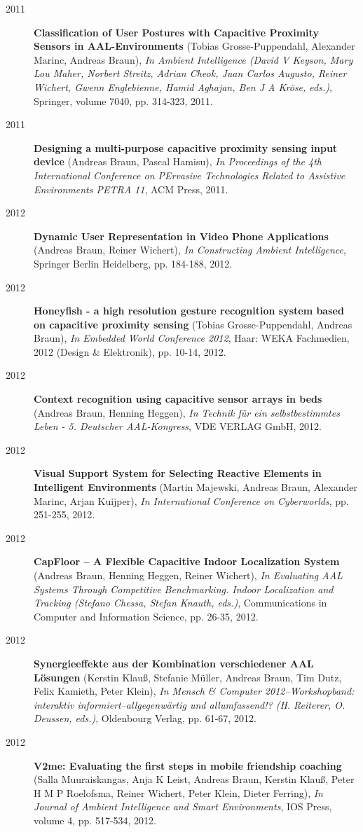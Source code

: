 \begin{appendix}
\begin{description}
\item[2011]{\bf Classification of User Postures with Capacitive Proximity Sensors in AAL-Environments} (Tobias Grosse-Puppendahl, Alexander Marinc, Andreas Braun), {\em In Ambient Intelligence (David V Keyson, Mary Lou Maher, Norbert Streitz, Adrian Cheok, Juan Carlos Augusto, Reiner Wichert, Gwenn Englebienne, Hamid Aghajan, Ben J A Kröse, eds.)}, Springer, volume 7040, pp. 314-323, 2011.
\item[2011]{\bf Designing a multi-purpose capacitive proximity sensing input device} (Andreas Braun, Pascal Hamisu), {\em In Proceedings of the 4th International Conference on PErvasive Technologies Related to Assistive Environments PETRA 11}, ACM Press, 2011.
\item[2012]{\bf Dynamic User Representation in Video Phone Applications} (Andreas Braun, Reiner Wichert), {\em In Constructing Ambient Intelligence}, Springer Berlin Heidelberg, pp. 184-188, 2012.
\item[2012]{\bf Honeyfish - a high resolution gesture recognition system based on capacitive proximity sensing} (Tobias Grosse-Puppendahl, Andreas Braun), {\em In Embedded World Conference 2012}, Haar: WEKA Fachmedien, 2012 (Design \& Elektronik), pp. 10-14, 2012.
\item[2012]{\bf Context recognition using capacitive sensor arrays in beds} (Andreas Braun, Henning Heggen), {\em In Technik für ein selbstbestimmtes Leben - 5. Deutscher AAL-Kongress}, VDE VERLAG GmbH, 2012.
\item[2012]{\bf Visual Support System for Selecting Reactive Elements in Intelligent Environments} (Martin Majewski, Andreas Braun, Alexander Marinc, Arjan Kuijper), {\em In International Conference on Cyberworlds}, pp. 251-255, 2012.
\item[2012]{\bf CapFloor – A Flexible Capacitive Indoor Localization System} (Andreas Braun, Henning Heggen, Reiner Wichert), {\em In Evaluating AAL Systems Through Competitive Benchmarking. Indoor Localization and Tracking (Stefano Chessa, Stefan Knauth, eds.)}, Communications in Computer and Information Science, pp. 26-35, 2012.
\item[2012]{\bf Synergieeffekte aus der Kombination verschiedener AAL Lösungen} (Kerstin Klauß, Stefanie Müller, Andreas Braun, Tim Dutz, Felix Kamieth, Peter Klein), {\em In Mensch \& Computer 2012--Workshopband: interaktiv informiert--allgegenwärtig und allumfassend!? (H. Reiterer, O. Deussen, eds.)}, Oldenbourg Verlag, pp. 61-67, 2012.
\item[2012]{\bf V2me: Evaluating the first steps in mobile friendship coaching} (Salla Muuraiskangas, Anja K Leist, Andreas Braun, Kerstin Klauß, Peter H M P Roelofsma, Reiner Wichert, Peter Klein, Dieter Ferring), {\em In Journal of Ambient Intelligence and Smart Environments}, IOS Press, volume 4, pp. 517-534, 2012.

\end{description}
\end{appendix}

